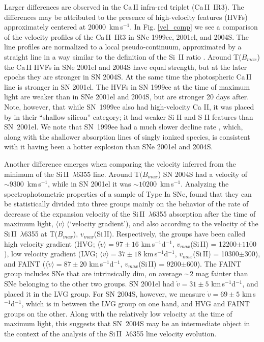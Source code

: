 \documentclass[12pt,preprint,psfig,epsf]{aastex}
\newcommand{\dmm}{\mbox{$\Delta$m$_{15}(B)$}}
\begin{document}
 Larger differences are observed in the Ca\,II infra-red triplet
(Ca\,II~IR3). The differences may be attributed to the presence of high-velocity 
features (HVFs) approximately centered at 20000~km\,s$^{-1}$.
In Fig. \ref{vel_comp} we see a comparison of the velocity profiles
of the Ca\,II~IR3 in SNe 1999ee, 2001el, and 2004S. The line profiles are  
normalized to a local pseudo-continuum, approximated by a straight line
in a way similar to the definition of the Si~II ratio \citep[see][]{Nug_etal95}.
Around T($B_{max}$) the Ca\,II HVFs in SNe 2001el and 2004S have equal strength,
but at the later epochs they are stronger in SN 2004S. At the same time the photospheric
Ca\,II line is stronger in SN 2001el. The HVFs in SN 1999ee at the time of
maximum light are weaker
than in SNe 2001el and 2004S, but are stronger 20 days after.
Note, however, that while SN~1999ee also had high-velocity Ca II, it was placed
by \citet{Bra_etal06} in their ``shallow-silicon'' category; it
had weaker Si II and S II features than SN~2001el.  We note that
SN~1999ee had a much slower decline rate \citep[\dmm = 0.94 $\pm$
0.06;][]{Str_etal02}, which, along with the shallower absorption lines
of singly ionized species, is consistent with it having been a hotter
explosion than SNe 2001el and 2004S.

Another difference emerges when comparing the velocity inferred from the
minimum of the Si\,II~$\lambda$6355 line. Around T$(B_{max}$) SN 2004S had a velocity of
$\sim9300$~km\,s$^{-1}$, while in SN 2001el it was $\sim10200$~km\,s$^{-1}$.
Analyzing the spectrophotometric properties of a sample of Type Ia SNe,
\citet{Ben_etal05} found that they can be
statistically divided into three groups mainly on the behavior of the rate
of decrease of the expansion velocity of the Si\,II~$\lambda$6355 absorption
after the time of maximum light, 
$\langle\dot{v}\rangle$ (`velocity gradient'), and also according to the
velocity of the Si\,II~$\lambda$6355 at T($B_{max}$), $v_{max}$(Si\,II). Respectively,
the groups have been called high velocity gradient (HVG;
$\langle\dot{v}\rangle = 97\pm16$ km\,s$^{-1}$d$^{-1}$, $v_{max}$(Si\,II) = 12200$\pm1100$),
low velocity gradient (LVG;
$\langle\dot{v}\rangle = 37\pm18$ km\,s$^{-1}$d$^{-1}$,  $v_{max}$(Si\,II) = 10300$\pm300$),
and FAINT ($\langle\dot{v}\rangle = 87\pm20$ km\,s$^{-1}$d$^{-1}$,   $v_{max}$(Si\,II) = 
9200$\pm600$).
The FAINT group includes SNe that are intrinsically dim, on average $\sim 2$ mag
fainter than SNe belonging to the other two groups. SN 2001el had $\dot{v}=31\pm5$
km\,s$^{-1}$d$^{-1}$,
and \citet{Ben_etal05} placed it in the LVG group. For SN 2004S, 
however, we measure  $\dot{v}=69\pm5$ km\,s$^{-1}$d$^{-1}$, which is in between the LVG 
group on one hand, and HVG and FAINT groups on the other. Along with the relatively
low velocity at the time of maximum light, this suggests that SN~2004S may be an 
intermediate object in the context of the analysis of the Si\,II~$\lambda$6355 
line velocity evolution.
\end{document}
